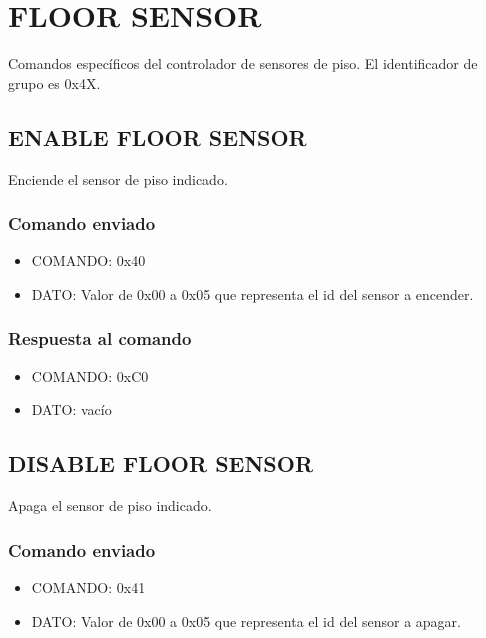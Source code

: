 \documentclass[a4paper,10pt]{article}
\begin{document}
\section{FLOOR SENSOR} 
\label{grupo_floor_sensor}

Comandos espec\'ificos del controlador de sensores de piso.
El identificador de grupo es 0x4X.

\subsection{ENABLE FLOOR SENSOR}
\label{enable_fs}

Enciende el sensor de piso indicado.

\subsubsection*{Comando enviado}

\begin{itemize}
	\item{COMANDO:} 0x40
	\item{DATO:} Valor de 0x00 a 0x05 que representa el id del sensor a encender.
\end{itemize}

\subsubsection*{Respuesta al comando}

\begin{itemize}
	\item{COMANDO:} 0xC0
	\item{DATO:} vac\'io
\end{itemize}

\subsection{DISABLE FLOOR SENSOR}
\label{disable_fs}

Apaga el sensor de piso indicado.

\subsubsection*{Comando enviado}

\begin{itemize}
	\item{COMANDO:} 0x41
	\item{DATO:} Valor de 0x00 a 0x05 que representa el id del sensor a apagar.
\end{itemize}
\end{document}
